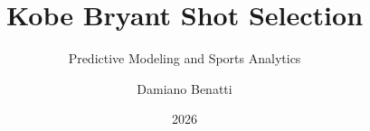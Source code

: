 \documentclass[aspectratio=169]{beamer}
\title[Kobe Bryant Shot Selection]{Kobe Bryant Shot Selection}
\subtitle{Predictive Modeling and Sports Analytics}
\author[Damiano Benatti]{Damiano Benatti}
\institute[Unibo]{Alma Mater Studiorum - Università di Bologna}
\date{2026}
\begin{document}
\begin{frame}
    \titlepage
\end{frame}







\end{document}

